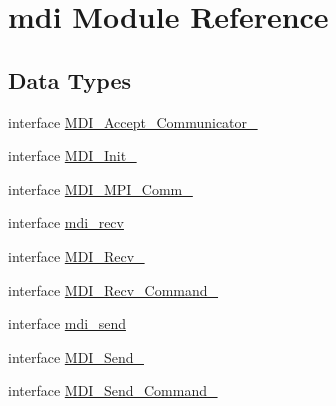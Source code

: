 \hypertarget{classmdi}{\section{mdi Module Reference}
\label{classmdi}
}
\subsection*{Data Types}
\begin{DoxyCompactItemize}
\item 
interface \hyperlink{interfacemdi_1_1MDI__Accept__Communicator__}{M\-D\-I\-\_\-\-Accept\-\_\-\-Communicator\-\_\-}
\item 
interface \hyperlink{interfacemdi_1_1MDI__Init__}{M\-D\-I\-\_\-\-Init\-\_\-}
\item 
interface \hyperlink{interfacemdi_1_1MDI__MPI__Comm__}{M\-D\-I\-\_\-\-M\-P\-I\-\_\-\-Comm\-\_\-}
\item 
interface \hyperlink{interfacemdi_1_1mdi__recv}{mdi\-\_\-recv}
\item 
interface \hyperlink{interfacemdi_1_1MDI__Recv__}{M\-D\-I\-\_\-\-Recv\-\_\-}
\item 
interface \hyperlink{interfacemdi_1_1MDI__Recv__Command__}{M\-D\-I\-\_\-\-Recv\-\_\-\-Command\-\_\-}
\item 
interface \hyperlink{interfacemdi_1_1mdi__send}{mdi\-\_\-send}
\item 
interface \hyperlink{interfacemdi_1_1MDI__Send__}{M\-D\-I\-\_\-\-Send\-\_\-}
\item 
interface \hyperlink{interfacemdi_1_1MDI__Send__Command__}{M\-D\-I\-\_\-\-Send\-\_\-\-Command\-\_\-}
\end{DoxyCompactItemize}

